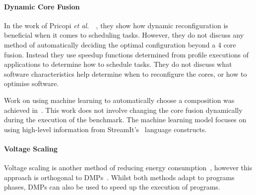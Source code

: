 \vspace{-0.5em}
\paragraph{Dynamic Core Fusion}
In the work of Pricopi {\it et al.~}~\cite{pricopiSchedCoreComp2014}, they show how dynamic reconfiguration is beneficial when it comes to scheduling tasks.
However, they do not discuss any method of automatically deciding the optimal configuration beyond a 4 core fusion.
Instead they use speedup functions determined from profile executions of applications to determine how to schedule tasks.
They do not discuss what software characteristics help determine when to reconfigure the cores, or how to optimise software.

Work on using machine learning to automatically choose a composition was achieved in~\cite{micolet2016dmpstream}.
This work does not involve changing the core fusion dynamically during the execution of the benchmark.
The machine learning model focuses on using high-level information from StreamIt's~\cite{thiesStreamit2010} language constructs.

\vspace{-0.5em}
\paragraph{Voltage Scaling}
Voltage scaling is another method of reducing energy consumption~\cite{paganiEECHM2017}, however this approach is orthogonal to DMPs~\cite{sibi}.
Whilst both methods adapt to programs phases, DMPs can also be used to speed up the execution of programs.
